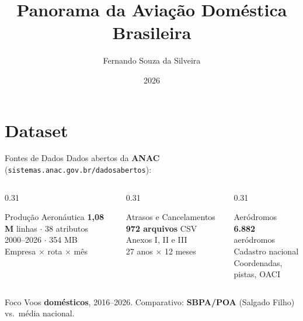 \documentclass[aspectratio=169]{beamer}
\title[Aviação Doméstica Brasileira]{Panorama da Aviação Doméstica Brasileira}
\author{Fernando Souza da Silveira}
\institute{PPGC -- UFRGS}
\date{2026}
\begin{document}
\begin{frame}
  \titlepage
\end{frame}

\section{Dataset}

\begin{frame}[t]{Fontes de Dados}
  Dados abertos da \textbf{ANAC} (\texttt{sistemas.anac.gov.br/dadosabertos}):
  \medskip
  \begin{columns}[T]
    \begin{column}{0.31\textwidth}
      \begin{block}{Produção Aeronáutica}
        \small
        \textbf{1,08 M} linhas $\cdot$ 38 atributos\\
        2000--2026 $\cdot$ 354 MB\\
        Empresa $\times$ rota $\times$ mês
      \end{block}
    \end{column}
    \begin{column}{0.31\textwidth}
      \begin{block}{Atrasos e Cancelamentos}
        \small
        \textbf{972 arquivos} CSV\\
        Anexos I, II e III\\
        27 anos $\times$ 12 meses
      \end{block}
    \end{column}
    \begin{column}{0.31\textwidth}
      \begin{block}{Aeródromos}
        \small
        \textbf{6.882} aeródromos\\
        Cadastro nacional\\
        Coordenadas, pistas, OACI
      \end{block}
    \end{column}
  \end{columns}
  \medskip
  \begin{alertblock}{Foco}
    Voos \textbf{domésticos}, 2016--2026.
    Comparativo: \textbf{SBPA/POA} (Salgado Filho) vs.\ média nacional.
  \end{alertblock}
\end{frame}
\end{document}
